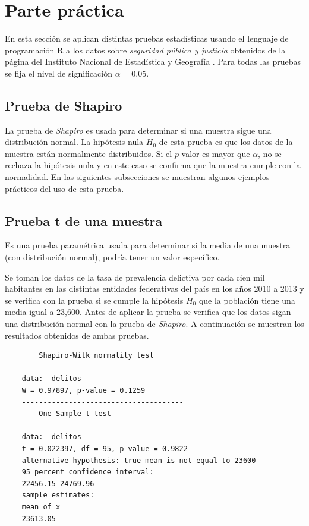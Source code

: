 \documentclass[12pt]{article}
\begin{document}
	
	 

	\section{Parte práctica}
	
	En esta sección se aplican distintas pruebas estadísticas usando el lenguaje de programación \textsc{R} \cite{rstatistics} a los datos sobre {\em seguridad pública y justicia} obtenidos de la página del Instituto Nacional de Estadística y Geografía \cite{inegi}. Para todas las pruebas se fija el nivel de significación $\alpha = 0.05$.
	
	\subsection{Prueba de Shapiro}
	
	La prueba de {\em Shapiro} es usada para determinar si una muestra sigue una distribución normal. La hipótesis nula $H_0$ de esta prueba es que los datos de la muestra están normalmente distribuidos. Si el $p$-valor es mayor que $\alpha$, no se rechaza la hipótesis nula y en este caso se confirma que la muestra cumple con la normalidad. En las siguientes subsecciones se muestran algunos ejemplos prácticos del uso de esta prueba.
	
	\subsection{Prueba t de una muestra}
	
	Es una prueba paramétrica usada para determinar si la media de una muestra (con distribución normal), podría tener un valor específico.
	
	Se toman los datos de la tasa de prevalencia delictiva por cada cien mil habitantes en las distintas entidades federativas del país en los años 2010 a 2013 y se verifica con la prueba si se cumple la hipótesis $H_0$ que la población tiene una media igual a 23,600. Antes de aplicar la prueba se verifica que los datos sigan una distribución normal con la prueba de {\em Shapiro}. A continuación se muestran los resultados obtenidos de ambas pruebas.
	\begin{verbatim}
		Shapiro-Wilk normality test
	
	data:  delitos
	W = 0.97897, p-value = 0.1259
	--------------------------------------
		One Sample t-test
	
	data:  delitos
	t = 0.022397, df = 95, p-value = 0.9822
	alternative hypothesis: true mean is not equal to 23600
	95 percent confidence interval:
	22456.15 24769.96
	sample estimates:
	mean of x 
	23613.05 
	\end{verbatim}
\end{document}

